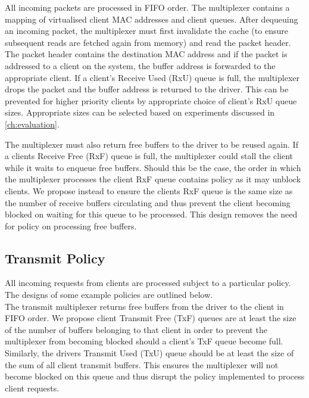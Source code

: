 All incoming packets are processed in FIFO order. The multiplexer contains a 
mapping of virtualised client MAC addresses and client queues. After dequeuing an incoming packet,
the multiplexer must first invalidate the cache (to ensure subsequent reads are fetched again from memory)
and read the packet header. The packet header contains the destination MAC address and if the packet is
addressed to a client on the system, the buffer address is forwarded to the appropriate client. 
If a client's Receive Used (RxU) queue is full, the multiplexer drops the packet and the buffer address is returned to
the driver. This can be prevented for higher priority clients by appropriate choice of client's RxU queue
sizes. Appropriate sizes can be selected based on experiments discussed in \autoref{ch:evaluation}.

The multiplexer must also return free buffers to the driver to be reused again. If a clients Receive Free
(RxF) queue is full, the multiplexer could stall the client while it waits to enqueue free buffers. Should this be the case,
the order in which the multiplexer processes the client RxF queue contains policy as it may
unblock clients. We propose instead to ensure the clients RxF queue is the same size as the number
of receive buffers circulating and thus prevent the client becoming blocked on waiting for this queue to be
processed. This design removes the need for policy on processing free buffers. \\ 

\subsection{Transmit Policy}

All incoming requests from clients are processed subject to a particular policy. The designs of some
example policies are outlined below.\\
The transmit multiplexer returns free buffers from the driver to the client in FIFO order.
We propose client Transmit Free (TxF) queues are at least the size of the number of buffers
belonging to that client in order to prevent the multiplexer from becoming blocked 
should a client's TxF queue become full. \\ 
Similarly, the drivers Transmit Used (TxU) queue should be at least the size of the sum of 
all client transmit buffers. This ensures the multiplexer will not become blocked on this queue
and thus disrupt the policy implemented to process client requests. \\ 

